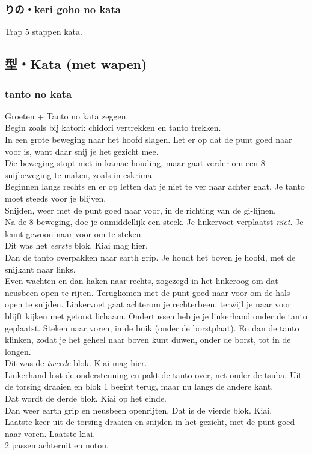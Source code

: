 \subsubsection{りの・keri goho no kata}
Trap 5 stappen kata.

\subsection{型・Kata (met wapen)}
\subsubsection{tanto no kata}
Groeten + Tanto no kata zeggen.\\
Begin zoals bij katori: chidori vertrekken en tanto trekken.\\
In een grote beweging naar het hoofd slagen. Let er op dat de punt goed naar voor is, want daar snij je het gezicht mee.\\
Die beweging stopt niet in kamae houding, maar gaat verder om een 8-snijbeweging te maken, zoals in eskrima.\\
Beginnen langs rechts en er op letten dat je niet te ver naar achter gaat. Je tanto moet steeds voor je blijven.\\
Snijden, weer met de punt goed naar voor, in de richting van de gi-lijnen.\\
Na de 8-beweging, doe je onmiddellijk een steek. Je linkervoet verplaatst \textit{niet}. Je leunt gewoon naar voor om te steken.\\
Dit was het \textit{eerste} blok. Kiai mag hier.\\
Dan de tanto overpakken naar earth grip. Je houdt het boven je hoofd, met de snijkant naar links.\\
Even wachten en dan haken naar rechts, zogezegd in het linkeroog om dat neusbeen open te rijten. Terugkomen met de punt goed naar voor om de hals open te snijden. Linkervoet gaat achterom je rechterbeen, terwijl je naar voor blijft kijken met getorst lichaam. Ondertussen heb je je linkerhand onder de tanto geplaatst. Steken naar voren, in de buik (onder de borstplaat). En dan de tanto klinken, zodat je het geheel naar boven kunt duwen, onder de borst, tot in de longen.\\
Dit was de \textit{tweede} blok. Kiai mag hier.\\
Linkerhand lost de ondersteuning en pakt de tanto over, net onder de tsuba. Uit de torsing draaien en blok 1 begint terug, maar nu langs de andere kant.\\
Dat wordt de derde blok. Kiai op het einde.\\
Dan weer earth grip en neusbeen openrijten. Dat is de vierde blok. Kiai.\\
Laatste keer uit de torsing draaien en snijden in het gezicht, met de punt goed naar voren. Laatste kiai.\\
2 passen achteruit en notou.

